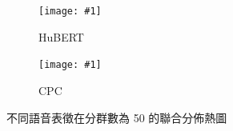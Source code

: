 {

\newcommand{\jeffheightt}[1]{\texttt{[image: \#1]}}

\begin{figure}
     \centering
     \begin{subfigure}{\textwidth}  %
         \centering
         \jeffheightt{figures/hubert-50-joint-byprob--new1.png}
         \caption{HuBERT}
         \label{fig:ch3-heatmap-model--hubert-50-joint-byprob}
     \end{subfigure}
     \vfill

     \begin{subfigure}{\textwidth}  %
         \centering
         \jeffheightt{figures/cpc-50-joint-byprob.png}
         \caption{CPC}
         \label{fig:ch3-heatmap-model--cpc-50-joint-byprob}
     \end{subfigure}

     \caption{不同語音表徵在分群數為 50 的聯合分佈熱圖}
     \label{fig:ch3-heatmap-model-comparison--part1}
\end{figure}


\begin{figure}
    \ContinuedFloat
     \centering
     

\end{figure}}
